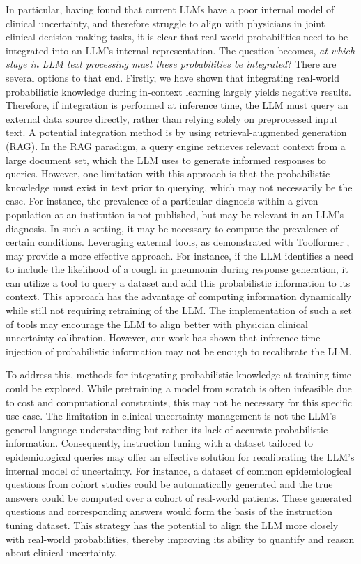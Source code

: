 In particular, having found that current LLMs have a poor internal model of clinical uncertainty, and therefore struggle to align with physicians in joint clinical decision-making tasks, it is clear that real-world probabilities need to be integrated into an LLM's internal representation. The question becomes,\emph{ at which stage in LLM text processing must these probabilities be integrated}? There are several options to that end. Firstly, we have shown that integrating real-world probabilistic knowledge during in-context learning largely yields negative results. Therefore, if integration is performed at inference time, the LLM must query an external data source directly, rather than relying solely on preprocessed input text. A potential integration method is by using retrieval-augmented generation (RAG)\cite{chenBenchmarkingLargeLanguage2024}. In the RAG paradigm, a query engine retrieves relevant context from a large document set, which the LLM uses to generate informed responses to queries. However, one limitation with this approach is that the probabilistic knowledge must exist in text prior to querying, which may not necessarily be the case. For instance, the prevalence of a particular diagnosis within a given population at an institution is not published, but may be relevant in an LLM's diagnosis. In such a setting, it may be necessary to compute the prevalence of certain conditions. Leveraging external tools, as demonstrated with Toolformer \citep{schickToolformerLanguageModels2023}, may provide a more effective approach. For instance, if the LLM identifies a need to include the likelihood of a cough in pneumonia during response generation, it can utilize a tool to query a dataset and add this probabilistic information to its context. This approach has the advantage of computing information dynamically while still not requiring retraining of the LLM. The implementation of such a set of tools may encourage the LLM to align better with physician clinical uncertainty calibration. However, our work has shown that inference time-injection of probabilistic information may not be enough to recalibrate the LLM. 

To address this, methods for integrating probabilistic knowledge at training time could be explored. While pretraining a model from scratch is often infeasible due to cost and computational constraints, this may not be necessary for this specific use case. The limitation in clinical uncertainty management is not the LLM's general language understanding but rather its lack of accurate probabilistic information. Consequently, instruction tuning with a dataset tailored to epidemiological queries may offer an effective solution for recalibrating the LLM's internal model of uncertainty. For instance, a dataset of common epidemiological questions from cohort studies could be automatically generated and the true answers could be computed over a cohort of real-world patients. These generated questions and corresponding answers would form the basis of the instruction tuning dataset. This strategy has the potential to align the LLM more closely with real-world probabilities, thereby improving its ability to quantify and reason about clinical uncertainty.

